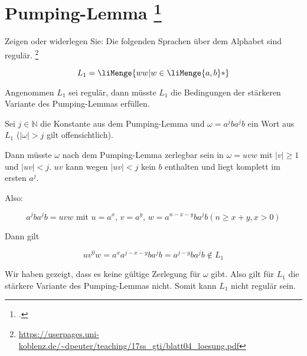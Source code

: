 \documentclass{lehramt-informatik-aufgabe}
\begin{document}
\let\m=\liMenge

\section{Pumping-Lemma
\footcite{}}

Zeigen oder widerlegen Sie: Die folgenden Sprachen über dem Alphabet
 sind regulär.
\footnote{\url{https://userpages.uni-koblenz.de/~dpeuter/teaching/17ss_gti/blatt04_loesung.pdf}}

\begin{displaymath}
L_1 = \m{ww | w \in \m{a, b} * }
\end{displaymath}

\begin{liAntwort}
\noindent
Angenommen $L_1$ sei regulär, dann müsste $L_1$ die Bedingungen der
stärkeren Variante des Pumping-Lemmas erfüllen.


\noindent
Sei $j \in \mathbb{N}$ die Konstante aus dem Pumping-Lemma und
$\omega = a^j b a^j b$ ein Wort aus $L_1$ ($|\omega| > j$ gilt offensichtlich).

Dann müsste $\omega$ nach dem Pumping-Lemma zerlegbar sein in $\omega = uvw$ mit
$|v| \geq 1$ und $|uv| < j$.
%
$uv$ kann wegen $|uv| < j$ kein $b$ enthalten und liegt komplett im
ersten $a^j$.

\noindent
Also:

\begin{displaymath}
a^j b a^j b = uvw \text{ mit }
u = a^x \text{, }
v = a^y \text{, }
w = a^{n - x - y} b a^j b (n \geq x + y, x > 0)
\end{displaymath}

\noindent
Dann gilt

\begin{displaymath}
u v^0 w = a^x a^{j - x - y} b a^j b = a^{j - y} b a^j b \notin L_1
\end{displaymath}

\noindent
Wir haben gezeigt, dass es keine gültige Zerlegung für $\omega$ gibt.
Also gilt für $L_1$ die stärkere Variante des Pumping-Lemmas nicht.
Somit kann $L_1$ nicht regulär sein.

\end{liAntwort}
\end{document}
